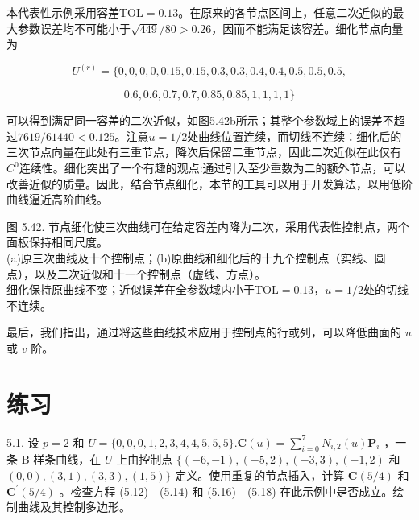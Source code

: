 \documentclass[../main.tex]{subfiles}
\begin{document}
本代表性示例采用容差$\mathrm{TOL}=0.13$。在原来的各节点区间上，任意二次近似的最大参数误差均不可能小于$\sqrt{449}/80>0.26$，因而不能满足该容差。细化节点向量为

\[
{U}^{\left( r\right) } = \{ 0,0,0,0,{0.15},{0.15},{0.3},{0.3},{0.4},{0.4},{0.5},{0.5},{0.5},
\]

\[
{0.6},{0.6},{0.7},{0.7},{0.85},{0.85},1,1,1,1\}
\]

可以得到满足同一容差的二次近似，如图5.42b所示；其整个参数域上的误差不超过$7619/61440<0.125$。注意$u=1/2$处曲线位置连续，而切线不连续：细化后的三次节点向量在此处有三重节点，降次后保留二重节点，因此二次近似在此仅有$C^0$连续性。细化突出了一个有趣的观点:通过引入至少重数为二的额外节点，可以改善近似的质量。因此，结合节点细化，本节的工具可以用于开发算法，以用低阶曲线逼近高阶曲线。

\begin{center}
\begin{minipage}{25.5cm}
\vspace*{.6\baselineskip}
\centering
{}
\par\smallskip
图 5.42. 节点细化使三次曲线可在给定容差内降为二次，采用代表性控制点，两个面板保持相同尺度。\\
(a)原三次曲线及十个控制点；(b)原曲线和细化后的十九个控制点（实线、圆点），以及二次近似和十一个控制点（虚线、方点）。\\
细化保持原曲线不变；近似误差在全参数域内小于$\mathrm{TOL}=0.13$，$u=1/2$处的切线不连续。
\end{minipage}
\end{center}

最后，我们指出，通过将这些曲线技术应用于控制点的行或列，可以降低曲面的 \(u\) 或 \(v\) 阶。

\section*{练习}

5.1. 设 \(p = 2\) 和 \(U = \{ 0,0,0,1,2,3,4,4,5,5,5\} .\mathbf{C}\left( u\right)  = \mathop{\sum }\limits_{{i = 0}}^{7}{N}_{i,2}\left( u\right) {\mathbf{P}}_{i}\) ，一条 B 样条曲线，在 \(U\) 上由控制点 \(\{ \left( {-6, - 1}\right) ,\left( {-5,2}\right) ,\left( {-3,3}\right) ,\left( {-1,2}\right)\) 和 \(\left( {0,0}\right) ,\left( {3,1}\right) ,\left( {3,3}\right) ,\left( {1,5}\right) \}\) 定义。使用重复的节点插入，计算 \(\mathbf{C}\left( {5/4}\right)\) 和 \({\mathbf{C}}^{\prime }\left( {5/4}\right)\) 。检查方程 (5.12) - (5.14) 和 (5.16) - (5.18) 在此示例中是否成立。绘制曲线及其控制多边形。
\end{document}
